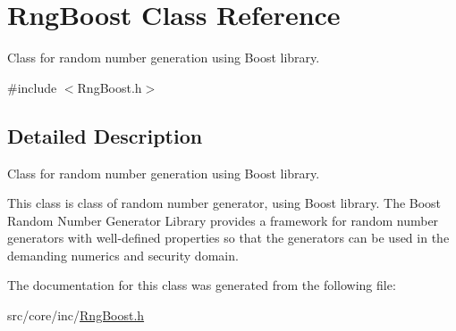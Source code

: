 \hypertarget{class_rng_boost}{\section{Rng\-Boost Class Reference}
\label{class_rng_boost}
}


Class for random number generation using Boost library.  




{\ttfamily \#include $<$Rng\-Boost.\-h$>$}



\subsection{Detailed Description}
Class for random number generation using Boost library. 

This class is class of random number generator, using Boost library. The Boost Random Number Generator Library provides a framework for random number generators with well-\/defined properties so that the generators can be used in the demanding numerics and security domain. 

The documentation for this class was generated from the following file\-:\begin{DoxyCompactItemize}
\item 
src/core/inc/\hyperlink{_rng_boost_8h}{Rng\-Boost.\-h}\end{DoxyCompactItemize}

